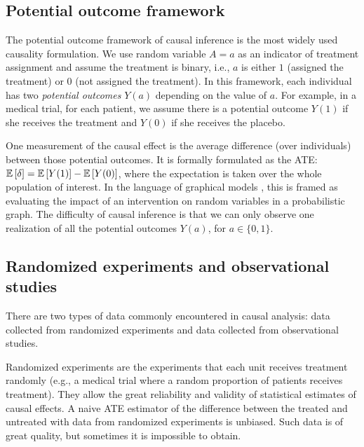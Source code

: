 \subsection{Potential outcome framework}\label{chpt:background:sec:potential}

The potential outcome framework of causal inference \citep{rubin1974ece} is the most widely used causality formulation. We use random variable $A = a$ as an indicator of treatment assignment and assume the treatment is binary, i.e., $a$ is either $1$ (assigned the treatment) or $0$ (not assigned the treatment). In this framework, each individual has two \textit{potential outcomes} $Y(a)$ depending on the value of $a$. For example, in a medical trial, for each patient, we assume there is a potential outcome $Y(1)$ if she receives the treatment and $Y(0)$ if she receives the placebo. 

One measurement of the causal effect is the average difference (over individuals) between those potential outcomes. It is formally formulated as the \gls{ATE}: $\mathbb{E}\left[\delta\right] = \mathbb{E}\left[Y(1)\right] - \mathbb{E}\left[Y(0)\right]$, where the expectation is taken over the whole population of interest. In the language of graphical models \citep{pearl2009causality},
this is framed as evaluating the impact of an intervention on random variables in a probabilistic graph. The difficulty of causal inference is that we can only observe one realization of all the potential outcomes $Y(a)$, for $a\in\{0, 1\}$. 

\subsection{Randomized experiments and observational studies} \label{chpt:background:sec:exp_obs}


There are two types of data commonly encountered in causal analysis: data collected from randomized experiments and data collected from observational studies. 

Randomized experiments are the experiments that each unit receives treatment randomly (e.g., a medical trial where a random proportion of patients receives treatment). They allow the great reliability and validity of statistical estimates of causal effects. A naive \gls{ATE} estimator of the difference between the treated and untreated with data from randomized experiments is unbiased. Such data is of great quality, but sometimes it is impossible to obtain. 

